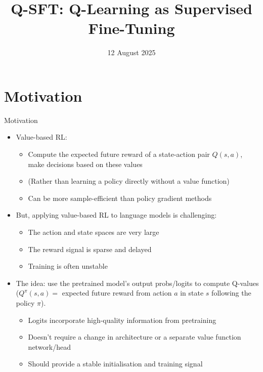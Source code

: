 \documentclass[aspectratio=169]{beamer}
\title{Q-SFT: Q-Learning as Supervised Fine-Tuning}
\date{12 August 2025}
\begin{document}
\begin{frame}
  \titlepage
\end{frame}


\section{Motivation}

\begin{frame}{Motivation}
  \begin{itemize}[<+->]
    \item Value-based RL: 
    \begin{itemize}
        \item Compute the expected future reward of a state-action pair $Q(s,a)$, make decisions based on these values
        \item (Rather than learning a policy directly without a value function)
        \item Can be more sample-efficient than policy gradient methods
    \end{itemize}
    \item But, applying value-based RL to language models is challenging:
  \begin{itemize}[<+->]
    \item The action and state spaces are very large 
    \item The reward signal is sparse and delayed
    \item Training is often unstable
  \end{itemize}
  \item The idea: use the pretrained model's output probs/logits to compute Q-values \\
  ($Q^\pi(s,a) = $ expected future reward from action $a$ in state $s$ following the policy $\pi$).
  \begin{itemize}[<+->]
    \item Logits incorporate high-quality information from pretraining
    \item Doesn't require a change in architecture or a separate value function network/head
    \item Should provide a stable initialisation and training signal
  \end{itemize}
  \end{itemize}
\end{frame}
\end{document}
